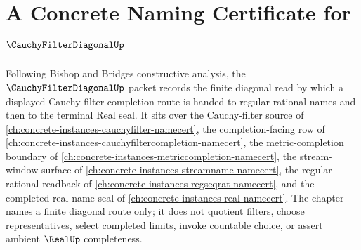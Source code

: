 \chapter{A Concrete Naming Certificate for $\CauchyFilterDiagonalUp$}
\label{ch:concrete-instances-cauchy-filter-diagonal-namecert}

Following Bishop and Bridges constructive analysis, the $\CauchyFilterDiagonalUp$ packet records the finite diagonal read by which a displayed Cauchy-filter completion route is handed to regular rational names and then to the terminal Real seal. It sits over the Cauchy-filter source of \autoref{ch:concrete-instances-cauchyfilter-namecert}, the completion-facing row of \autoref{ch:concrete-instances-cauchyfiltercompletion-namecert}, the metric-completion boundary of \autoref{ch:concrete-instances-metriccompletion-namecert}, the stream-window surface of \autoref{ch:concrete-instances-streamname-namecert}, the regular rational readback of \autoref{ch:concrete-instances-regseqrat-namecert}, and the completed real-name seal of \autoref{ch:concrete-instances-real-namecert}. The chapter names a finite diagonal route only; it does not quotient filters, choose representatives, select completed limits, invoke countable choice, or assert ambient $\RealUp$ completeness.

